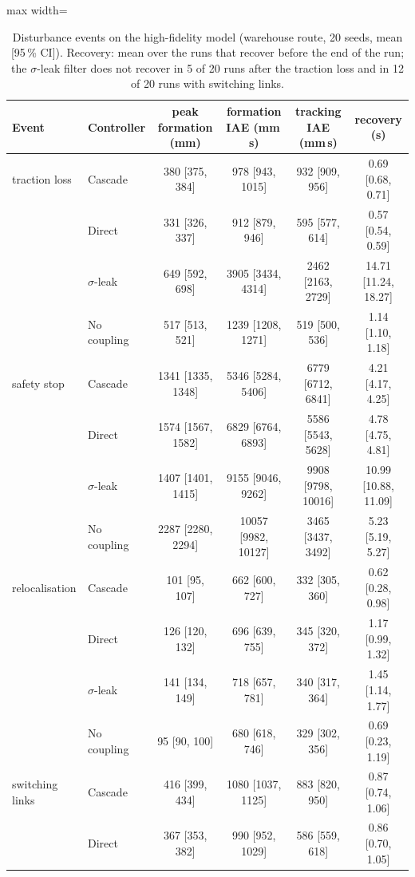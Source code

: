 \begin{table}[htbp]\centering\small
\caption{Disturbance events on the high-fidelity model (warehouse route, 20 seeds, mean [95\,\% CI]). Recovery: mean over the runs that recover before the end of the run; the $\sigma$-leak filter does not recover in 5 of 20 runs after the traction loss and in 12 of 20 runs with switching links.}\label{tab:r6}
\begin{adjustbox}{max width=\linewidth}
\begin{tabular}{@{}llcccc@{}}\toprule
Event & Controller & peak formation (mm) & formation IAE (mm\,s) & tracking IAE (mm\,s) & recovery (s)\\\midrule
traction loss & Cascade & 380 [375, 384] & 978 [943, 1015] & 932 [909, 956] & 0.69 [0.68, 0.71]\\
 & Direct & 331 [326, 337] & 912 [879, 946] & 595 [577, 614] & 0.57 [0.54, 0.59]\\
 & $\sigma$-leak & 649 [592, 698] & 3905 [3434, 4314] & 2462 [2163, 2729] & 14.71 [11.24, 18.27]\\
 & No coupling & 517 [513, 521] & 1239 [1208, 1271] & 519 [500, 536] & 1.14 [1.10, 1.18]\\
\addlinespace
safety stop & Cascade & 1341 [1335, 1348] & 5346 [5284, 5406] & 6779 [6712, 6841] & 4.21 [4.17, 4.25]\\
 & Direct & 1574 [1567, 1582] & 6829 [6764, 6893] & 5586 [5543, 5628] & 4.78 [4.75, 4.81]\\
 & $\sigma$-leak & 1407 [1401, 1415] & 9155 [9046, 9262] & 9908 [9798, 10016] & 10.99 [10.88, 11.09]\\
 & No coupling & 2287 [2280, 2294] & 10057 [9982, 10127] & 3465 [3437, 3492] & 5.23 [5.19, 5.27]\\
\addlinespace
relocalisation & Cascade & 101 [95, 107] & 662 [600, 727] & 332 [305, 360] & 0.62 [0.28, 0.98]\\
 & Direct & 126 [120, 132] & 696 [639, 755] & 345 [320, 372] & 1.17 [0.99, 1.32]\\
 & $\sigma$-leak & 141 [134, 149] & 718 [657, 781] & 340 [317, 364] & 1.45 [1.14, 1.77]\\
 & No coupling & 95 [90, 100] & 680 [618, 746] & 329 [302, 356] & 0.69 [0.23, 1.19]\\
\addlinespace
switching links & Cascade & 416 [399, 434] & 1080 [1037, 1125] & 883 [820, 950] & 0.87 [0.74, 1.06]\\
 & Direct & 367 [353, 382] & 990 [952, 1029] & 586 [559, 618] & 0.86 [0.70, 1.05]\\

\end{tabular}
\end{adjustbox}
\end{table}
